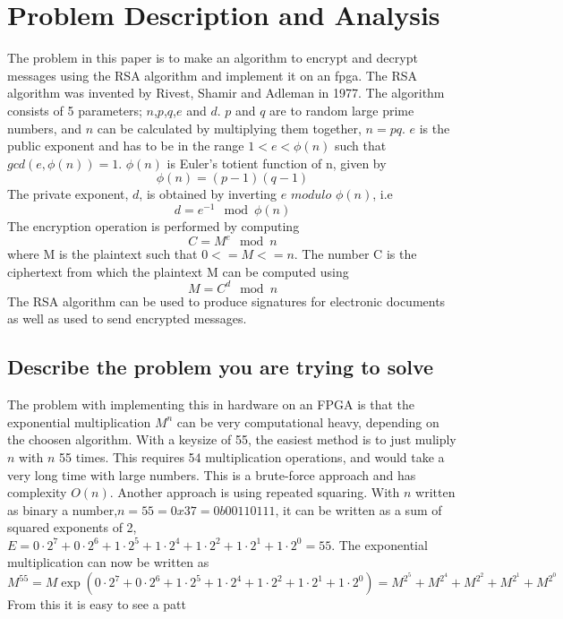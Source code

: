 \section{Problem Description and Analysis}
The problem in this paper is to make an algorithm to encrypt and decrypt messages using the
RSA algorithm and implement it on an fpga. The RSA algorithm was invented by Rivest, Shamir
and Adleman in 1977. The algorithm consists of 5 parameters; $n$,$p$,$q$,$e$ and $d$. 
$p$ and $q$ are to random large prime numbers, and $n$ can be calculated by multiplying 
them together, $n=pq$. $e$ is the public exponent and has to be in the range $1<e<\phi(n)$ 
such that $gcd(e,\phi(n))=1$. $\phi(n)$ is Euler's totient function of n, given by
\begin{equation}
    \phi(n)=(p-1)(q-1)
\end{equation}
The private exponent, $d$, is obtained by inverting $e$ $modulo$ $\phi(n)$, i.e
\begin{equation}
    d=e^{-1}\mod{\phi(n)}
\end{equation}
The encryption operation is performed by computing
\begin{equation}
    C=M^e\mod{n}
\end{equation}
where M is the plaintext such that $0<=M<=n$. The number C is the ciphertext from 
which the plaintext M can be computed using
\begin{equation}
    M=C^d\mod{n}
\end{equation}
The RSA algorithm can be used to produce signatures for electronic documents as well
as used to send encrypted messages. 

\subsection{Describe the problem you are trying to solve}
The problem with implementing this in hardware on an FPGA is that the exponential multiplication
$M^n$ can be very computational heavy, depending on the choosen algorithm. With a keysize of 55,
the easiest method is to just muliply $n$ with $n$ 55 times. This requires 54 multiplication
operations, and would take a very long time with large numbers. This is a brute-force approach
and has complexity $O(n)$. Another approach is using repeated squaring. With $n$ written as binary a
number,$n=55=0x37=0b00110111$, it can be written as a sum of squared exponents of 2, 
$E=0\cdot2^7 + 0\cdot2^6 + 1\cdot2^5 + 1\cdot2^4 + 1\cdot2^2 + 1\cdot2^1 + 1\cdot2^0=55$. The exponential multiplication can now be written as
\begin{equation}
M^{55}=M\exp(0\cdot2^7 + 0\cdot2^6 + 1\cdot2^5 + 1\cdot2^4 + 1\cdot2^2 + 1\cdot2^1 + 1\cdot2^0) 
= M^{2^5} + M^{2^4} + M^{2^2} + M^{2^1} + M^{2^0} 
\end{equation}
From this it is easy to see a patt
